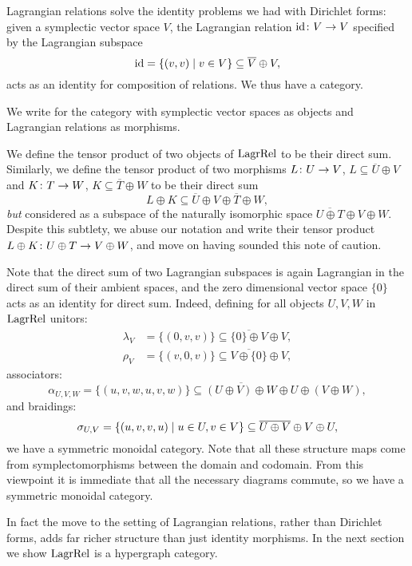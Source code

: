 Lagrangian relations solve the identity problems we had with Dirichlet forms:
given a symplectic vector space $V$, the Lagrangian relation $\mathrm{id}{\colon} V \to V$
specified by the Lagrangian subspace
\[
  \mathrm{id} = \{(v,v) \mid v \in V\} \subseteq \overline{V} \oplus V,
\]
acts as an identity for composition of relations. We thus have a category.

\begin{definition}
  We write  for the category with symplectic
  vector spaces as objects and Lagrangian relations as morphisms. 
\end{definition}

We define the tensor product of two objects of $\mathrm{LagrRel}$ to be their
direct sum. Similarly, we define the tensor product of two morphisms $L{\colon} U
\to V$, $L \subseteq \overline{U}\oplus V$ and $K{\colon} T \to W$, $K \subseteq
\overline{T} \oplus W$ to be their direct sum
\[
  L \oplus K \subseteq \overline{U}\oplus V \oplus\overline{T} \oplus W,
\]
\emph{but} considered as a subspace of the naturally isomorphic space
$\overline{U \oplus T} \oplus V \oplus W$.  Despite this subtlety, we abuse our
notation and write their tensor product $L \oplus K{\colon} U \oplus T \to V \oplus
W$, and move on having sounded this note of caution. 

Note that the direct sum of two Lagrangian subspaces is
again Lagrangian in the direct sum of their ambient spaces, and the zero
dimensional vector space $\{0\}$ acts as an identity for direct sum. Indeed,
defining for all objects $U,V,W$ in $\mathrm{LagrRel}$ unitors: 
\begin{align*}
  \lambda_V &= \{(0,v,v)\} \subseteq \overline{\{0\} \oplus V} \oplus V, \\
  \rho_V &= \{(v,0,v)\} \subseteq \overline{V \oplus \{0\}} \oplus V,
\end{align*}
associators:
\[
  \alpha_{U,V,W}= \{(u,v,w,u,v,w)\} \subseteq \overline{(U \oplus V)\oplus W}
  \oplus U \oplus (V \oplus W),
\]
and braidings:
\[
  \sigma_{U,V} = \{(u,v,v,u) \mid u \in U, v \in V\} \subseteq \overline{U \oplus V}
  \oplus V \oplus U,
\]
we have a symmetric monoidal category.  Note that all these structure
maps come from symplectomorphisms between the domain and codomain. From this
viewpoint it is immediate that all the necessary diagrams commute, so we
have a symmetric monoidal category. 

In fact the move to the setting of Lagrangian relations, rather than Dirichlet
forms, adds far richer structure than just identity morphisms. In the next
section we show $\mathrm{LagrRel}$ is a hypergraph category.

